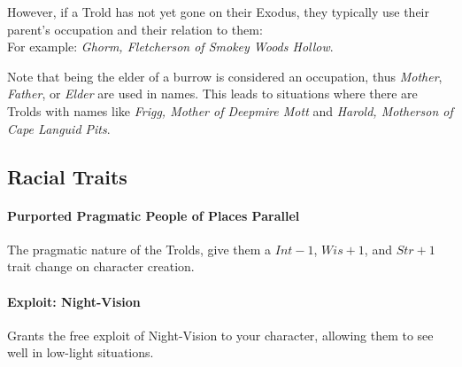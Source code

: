 However, if a Trold has not yet gone on their Exodus, they typically use their parent's occupation and their relation to them:\\
For example: \textit{Ghorm, Fletcherson of Smokey Woods Hollow}.

Note that being the elder of a burrow is considered an occupation, thus \textit{Mother}, \textit{Father}, or \textit{Elder} are used in names.
This leads to situations where there are Trolds with names like \textit{Frigg, Mother of Deepmire Mott} and \textit{Harold, Motherson of Cape Languid Pits}.

\subsection{Racial Traits}

\paragraph{Purported Pragmatic People of Places Parallel}
The pragmatic nature of the Trolds, give them a $Int-1$, $Wis+1$, and $Str+1$ trait change on character creation.

\paragraph{Exploit: Night-Vision}
Grants the free exploit of Night-Vision to your character, allowing them to see well in low-light situations.